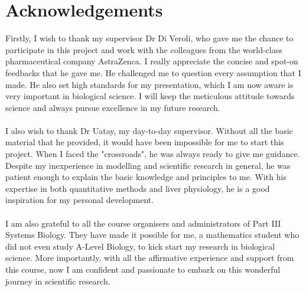 \documentclass[12pt]{article}
\begin{document}
\section*{Acknowledgements}
Firstly, I wish to thank my supervisor Dr Di Veroli, who gave me the chance to participate in this project and work with the colleagues from the world-class pharmaceutical company AstraZenca. I really appreciate the concise and spot-on feedbacks that he gave me. He challenged me to question every assumption that I made. He also set high standards for my presentation, which I am now aware is very important in biological science. I will keep the meticulous attitude towards science and always pursue excellence in my future research.\\\\
I also wish to thank Dr Uatay, my day-to-day supervisor. Without all the basic material that he provided, it would have been impossible for me to start this project. When I faced the "crossroads", he was always ready to give me guidance. Despite my inexperience in modelling and scientific research in general, he was patient enough to explain the basic knowledge and principles to me. With his expertise in both quantitative methods and liver physiology, he is a good inspiration for my personal development.\\\\
I am also grateful to all the course organisers and administrators of Part III Systems Biology. They have made it possible for me, a mathematics student who did not even study A-Level Biology, to kick start my research in biological science. More importantly, with all the affirmative experience and support from this course, now I am confident and passionate to embark on this wonderful journey in scientific research.
\pagebreak





\end{document}
